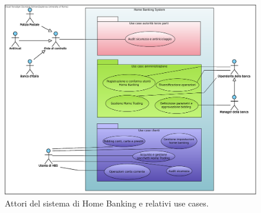 \documentclass[10pt]{softeng} %
\begin{document}


\printcustombibsmall{}


\begin{figure}[hbt]
	\centering
	\includegraphics[width=\textwidth]{Images/Home_Banking_inception_use_cases.eps}
	\caption{Attori del sistema di Home Banking e relativi use cases.}
	\label{fig:inception_use_cases}
\end{figure}
\end{document}
